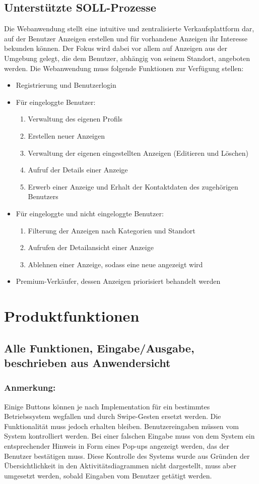 \documentclass[a4paper,12pt,oneside]{scrartcl}
\begin{document}
\subsection{Unterstützte SOLL-Prozesse}
Die Webanwendung stellt eine intuitive und zentralisierte Verkaufsplattform dar, auf der Benutzer Anzeigen erstellen und für vorhandene Anzeigen ihr Interesse bekunden können.
Der Fokus wird dabei vor allem auf Anzeigen aus der Umgebung gelegt, die dem Benutzer, abhängig von seinem Standort, angeboten werden.
Die Webanwendung muss folgende Funktionen zur Verfügung stellen:
\begin{itemize}
	\item Registrierung und Benutzerlogin
	\item Für eingeloggte Benutzer:
	\begin{enumerate}
		\item Verwaltung des eigenen Profils
		\item Erstellen neuer Anzeigen
		\item Verwaltung der eigenen eingestellten Anzeigen (Editieren und Löschen)
		\item Aufruf der Details einer Anzeige
		\item Erwerb einer Anzeige und Erhalt der Kontaktdaten des zugehörigen Benutzers
	\end{enumerate}
	\item Für eingeloggte und nicht eingeloggte Benutzer:
	\begin{enumerate}
		\item Filterung der Anzeigen nach Kategorien und Standort
		\item Aufrufen der Detailansicht einer Anzeige
		\item Ablehnen einer Anzeige, sodass eine neue angezeigt wird
	\end{enumerate}
	\item Premium-Verkäufer, dessen Anzeigen priorisiert behandelt werden
\end{itemize}




\section{Produktfunktionen}
\subsection{Alle Funktionen, Eingabe/Ausgabe, beschrieben aus Anwendersicht}

\subsubsection*{Anmerkung:}
Einige Buttons können je nach Implementation für ein bestimmtes Betriebssystem wegfallen und durch Swipe-Gesten ersetzt werden.
Die Funktionalität muss jedoch erhalten bleiben.
Benutzereingaben müssen vom System kontrolliert werden.
Bei einer falschen Eingabe muss von dem System ein entsprechender Hinweis in Form eines Pop-ups angezeigt werden, das der Benutzer bestätigen muss.
Diese Kontrolle des Systems wurde aus Gründen der Übersichtlichkeit in den Aktivitätsdiagrammen nicht dargestellt, muss aber umgesetzt werden, sobald Eingaben vom Benutzer getätigt werden.
\end{document}
